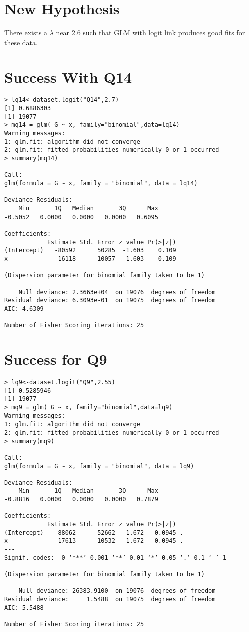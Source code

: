 \documentclass{amsart}
\begin{document}
\section{New Hypothesis}

There exists a $\lambda$ near 2.6 such that GLM with logit link produces good fits for these data.

\section{Success With Q14}

\begin{verbatim}
> lq14<-dataset.logit("Q14",2.7)
[1] 0.6886303
[1] 19077
> mq14 = glm( G ~ x, family="binomial",data=lq14)
Warning messages:
1: glm.fit: algorithm did not converge 
2: glm.fit: fitted probabilities numerically 0 or 1 occurred 
> summary(mq14)

Call:
glm(formula = G ~ x, family = "binomial", data = lq14)

Deviance Residuals: 
    Min       1Q   Median       3Q      Max  
-0.5052   0.0000   0.0000   0.0000   0.6095  

Coefficients:
            Estimate Std. Error z value Pr(>|z|)
(Intercept)   -80592      50285  -1.603    0.109
x              16118      10057   1.603    0.109

(Dispersion parameter for binomial family taken to be 1)

    Null deviance: 2.3663e+04  on 19076  degrees of freedom
Residual deviance: 6.3093e-01  on 19075  degrees of freedom
AIC: 4.6309

Number of Fisher Scoring iterations: 25
\end{verbatim}

\section{Success for Q9}

\begin{verbatim}
> lq9<-dataset.logit("Q9",2.55)
[1] 0.5285946
[1] 19077
> mq9 = glm( G ~ x, family="binomial",data=lq9)
Warning messages:
1: glm.fit: algorithm did not converge 
2: glm.fit: fitted probabilities numerically 0 or 1 occurred 
> summary(mq9)

Call:
glm(formula = G ~ x, family = "binomial", data = lq9)

Deviance Residuals: 
    Min       1Q   Median       3Q      Max  
-0.8816   0.0000   0.0000   0.0000   0.7879  

Coefficients:
            Estimate Std. Error z value Pr(>|z|)  
(Intercept)    88062      52662   1.672   0.0945 .
x             -17613      10532  -1.672   0.0945 .
---
Signif. codes:  0 ‘***’ 0.001 ‘**’ 0.01 ‘*’ 0.05 ‘.’ 0.1 ‘ ’ 1

(Dispersion parameter for binomial family taken to be 1)

    Null deviance: 26383.9100  on 19076  degrees of freedom
Residual deviance:     1.5488  on 19075  degrees of freedom
AIC: 5.5488

Number of Fisher Scoring iterations: 25
\end{verbatim}
\end{document}
